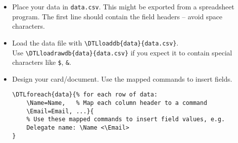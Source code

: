 \begin{itemize}[leftmargin=0pt,topsep=6pt,itemsep=1pt]
\tiny
\item Place your data in \texttt{data.csv}. This might be exported from a spreadsheet program. The first line should contain the field headers -- avoid space characters. 

\item Load the data file with \verb|\DTLloaddb{data}{data.csv}|.\\ Use \verb|\DTLloadrawdb{data}{data.csv}| if you expect it to contain special characters like \verb|$|, \verb|&|.

\item Design your card/document. Use the mapped commands to insert fields.
\begin{lstlisting}
\DTLforeach{data}{% for each row of data:
    \Name=Name,   % Map each column header to a command
    \Email=Email, ...}{
    % Use these mapped commands to insert field values, e.g.
    Delegate name: \Name <\Email>  
}
\end{lstlisting}
\end{itemize}

\clearpage

